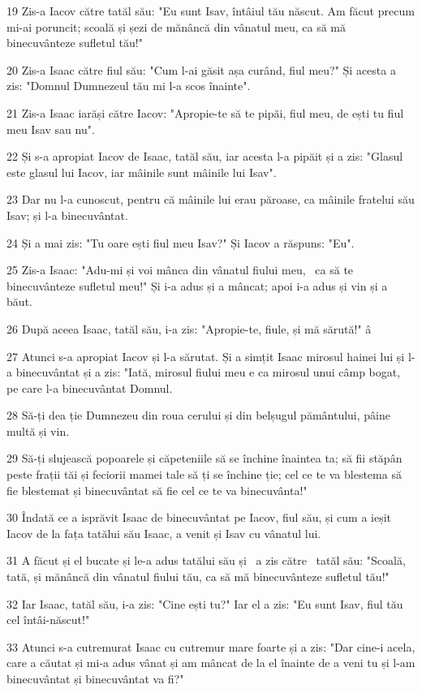 \par 19 Zis-a Iacov către tatăl său: "Eu sunt Isav, întâiul tău născut. Am făcut precum mi-ai poruncit; scoală și șezi de mănâncă din vânatul meu, ca să mă binecuvânteze sufletul tău!"
\par 20 Zis-a Isaac către fiul său: "Cum l-ai găsit așa curând, fiul meu?" Și acesta a zis: "Domnul Dumnezeul tău mi l-a scos înainte".
\par 21 Zis-a Isaac iarăși către Iacov: "Apropie-te să te pipăi, fiul meu, de ești tu fiul meu Isav sau nu".
\par 22 Și s-a apropiat Iacov de Isaac, tatăl său, iar acesta l-a pipăit și a zis: "Glasul este glasul lui Iacov, iar mâinile sunt mâinile lui Isav".
\par 23 Dar nu l-a cunoscut, pentru că mâinile lui erau păroase, ca mâinile fratelui său Isav; și l-a binecuvântat.
\par 24 Și a mai zis: "Tu oare ești fiul meu Isav?" Și Iacov a răspuns: "Eu".
\par 25 Zis-a Isaac: "Adu-mi și voi mânca din vânatul fiului meu,  ca să te binecuvânteze sufletul meu!" Și i-a adus și a mâncat; apoi i-a adus și vin și a băut.
\par 26 După aceea Isaac, tatăl său, i-a zis: "Apropie-te, fiule, și mă sărută!" â
\par 27 Atunci s-a apropiat Iacov și l-a sărutat. Și a simțit Isaac mirosul hainei lui și l-a binecuvântat și a zis: "Iată, mirosul fiului meu e ca mirosul unui câmp bogat, pe care l-a binecuvântat Domnul.
\par 28 Să-ți dea ție Dumnezeu din roua cerului și din belșugul pământului, pâine multă și vin.
\par 29 Să-ți slujească popoarele și căpeteniile să se închine înaintea ta; să fii stăpân peste frații tăi și feciorii mamei tale să ți se închine ție; cel ce te va blestema să fie blestemat și binecuvântat să fie cel ce te va binecuvânta!"
\par 30 Îndată ce a isprăvit Isaac de binecuvântat pe Iacov, fiul său, și cum a ieșit Iacov de la fața tatălui său Isaac, a venit și Isav cu vânatul lui.
\par 31 A făcut și el bucate și le-a adus tatălui său și  a zis către  tatăl său: "Scoală, tată, și mănâncă din vânatul fiului tău, ca să mă binecuvânteze sufletul tău!"
\par 32 Iar Isaac, tatăl său, i-a zis: "Cine ești tu?" Iar el a zis: "Eu sunt Isav, fiul tău cel întâi-născut!"
\par 33 Atunci s-a cutremurat Isaac cu cutremur mare foarte și a zis: "Dar cine-i acela, care a căutat și mi-a adus vânat și am mâncat de la el înainte de a veni tu și l-am binecuvântat și binecuvântat va fi?"
